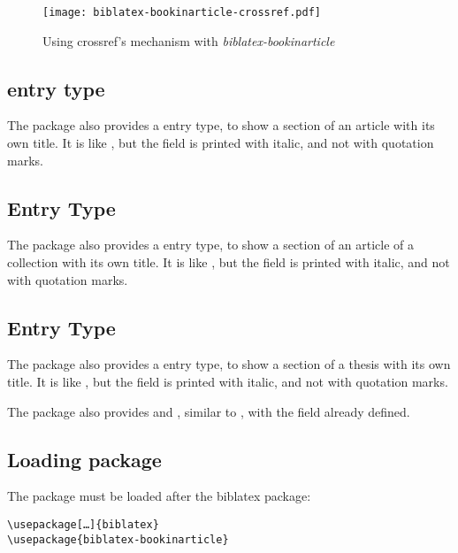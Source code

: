 \documentclass{ltxdockit}[2011/03/25]
\newcommand{\biblatex}{biblatex\xspace}
\begin{document}
\begin{figure}
  \centering
\texttt{[image: biblatex-bookinarticle-crossref.pdf]}
\label{crossref}
\caption{Using crossref's mechanism with \emph{biblatex-bookinarticle}}
\end{figure}

\subsection{ entry type}

The package also provides a  entry type, to show a section of an article with its own title. It is like , but the  field is printed with italic, and not with quotation marks.


\subsection{ Entry Type}

The package also provides a  entry type, to show a section of an article of a collection with its own title. It is like , but the  field is printed with italic, and not with quotation marks.

\subsection{ Entry Type}

The package also provides a  entry type, to show a section of a thesis with its own title. It is like , but the  field is printed with italic, and not with quotation marks.

The package also provides  and , similar to , with the  field already defined.


\subsection{Loading package}

The package must be loaded after the \biblatex package:
\begin{verbatim}
\usepackage[…]{biblatex}
\usepackage{biblatex-bookinarticle}
\end{verbatim}
\end{document}

